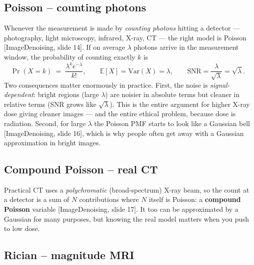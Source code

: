 \documentclass[11pt]{article}
\newcommand{\E}{\mathbb{E}}
\newcommand{\deck}[1]{\textsf{\small[#1]}}
\begin{document}
\subsection{Poisson -- counting photons}

Whenever the measurement is made by \emph{counting photons} hitting a detector
--- photography, light microscopy, infrared, X-ray, CT --- the right model is
Poisson \deck{ImageDenoising, slide 14}. If on average $\lambda$ photons arrive
in the measurement window, the probability of counting exactly $k$ is
\[
\Pr(X=k) \;=\; \frac{\lambda^{k} e^{-\lambda}}{k!},
\qquad \E[X] = \mathrm{Var}(X) = \lambda,
\qquad \mathrm{SNR} = \frac{\lambda}{\sqrt{\lambda}} = \sqrt{\lambda}.
\]
Two consequences matter enormously in practice. First, the noise is
\emph{signal-dependent}: bright regions (large $\lambda$) are noisier in
absolute terms but cleaner in relative terms (SNR grows like $\sqrt\lambda$).
This is the entire argument for higher X-ray dose giving cleaner images --- and
the entire ethical problem, because dose is radiation. Second, for large
$\lambda$ the Poisson PMF starts to look like a Gaussian bell
\deck{ImageDenoising, slide 16}, which is why people often get away with a
Gaussian approximation in bright images.

\subsection{Compound Poisson -- real CT}

Practical CT uses a \emph{polychromatic} (broad-spectrum) X-ray beam, so the
count at a detector is a sum of $N$ contributions where $N$ itself is Poisson:
a \textbf{compound Poisson} variable \deck{ImageDenoising, slide 17}. It too can
be approximated by a Gaussian for many purposes, but knowing the real model
matters when you push to low dose.

\subsection{Rician -- magnitude MRI}
\end{document}
